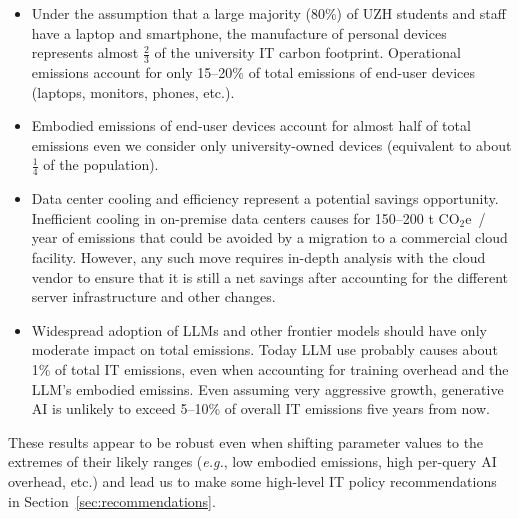 \documentclass[11pt]{article}
\newcommand{\eg}{{\em e.g.}}
\newcommand{\coe}{CO$_2$e}
\begin{document}
\begin{itemize}

  \item Under the assumption that a large majority (80\%) of UZH students and staff have a laptop and smartphone, the manufacture of personal devices represents almost $\frac{2}{3}$ of the university IT carbon footprint. Operational emissions account for only 15--20\% of total emissions of end-user devices (laptops, monitors, phones, etc.).

  \item Embodied emissions of end-user devices account for almost half of total emissions even we consider only university-owned devices (equivalent to about $\frac{1}{4}$ of the population).

  \item Data center cooling and efficiency represent a potential savings opportunity. Inefficient cooling in on-premise data centers causes for 150--200 t \coe\ / year of emissions that could be avoided by a migration to a commercial cloud facility. However, any such move requires in-depth analysis with the cloud vendor to ensure that it is still a net savings after accounting for the different server infrastructure and other changes.

  \item Widespread adoption of LLMs and other frontier models should have only moderate impact on total emissions. Today LLM use probably causes about 1\% of total IT emissions, even when accounting for training overhead and the LLM's embodied emissins. Even assuming very aggressive growth, generative AI is unlikely to exceed 5--10\% of overall IT emissions five years from now.

\end{itemize}

These results appear to be robust even when shifting parameter values to the extremes of their likely ranges (\eg, low embodied emissions, high per-query AI overhead, etc.) and lead us to make some high-level IT policy recommendations in Section~\ref{sec:recommendations}.

\printbibliography
\end{document}
